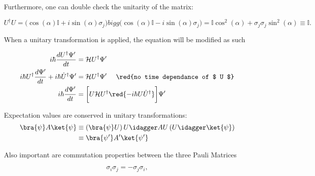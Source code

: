  \noindent  Furthermore,  one can  double  check  the unitarity  of  the
 matrix:

 \begin{equation}\label{uniunitary}
   U^{\dagger}U =\bigg( \cos(\alpha)\mathbb{I}+i\sin(\alpha)\sigma_j\bigg)bigg( \cos(\alpha)\mathbb{I}-i\sin(\alpha)\sigma_j\bigg) = \mathbb{I}\cos^2(\alpha)+\sigma_j\sigma_j\sin^2(\alpha)\equiv\mathbb{I}.
 \end{equation}

 \noindent         When         a         unitary         transformation
  is  applied, the  \schrodinger
 equation will be modified as such

 \begin{equation}\label{duninewschroer}
   \begin{aligned}
     i\hbar\frac{dU^{\dagger}\Psi'}{dt} & = \mathcal{H}U^{\dagger}\Psi'\\
     i\hbar{U}^{\dagger}\frac{d\Psi'}{dt} + i\hbar\dot{U}^{\dagger}{\Psi'} & = \mathcal{H}U^{\dagger}\Psi' \quad\text{ \red{no time dependance of $ U $}}\\
     i\hbar\frac{d\Psi'}{dt} & = \bigg[U\mathcal{H}U^{\dagger} \red{-i\hbar U\dot{U}^{\dagger}}\bigg]\Psi'\\
   \end{aligned}
 \end{equation}

\begin{framed}\noindent
  Expectation values are conserved in unitary transformations:
  \[
    \begin{aligned}
      \bra{\psi}A\ket{\psi} & \equiv \left(\bra{\psi}U\right)U\idagger AU\left(U\idagger\ket{\psi}\right)\\
      & \equiv \bra{\psi'}A'\ket{\psi'}
    \end{aligned}
  \]
\end{framed}

\noindent Also  important are  commutation properties between  the three
Pauli Matrices

 \begin{equation}\label{uniComm}
   \sigma_i\sigma_j=-\sigma_j\sigma_i,
 \end{equation}

